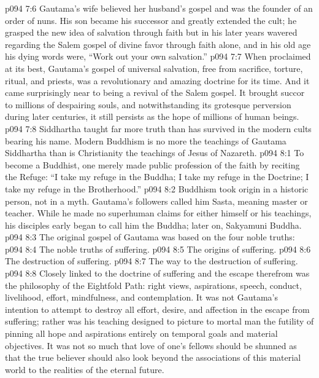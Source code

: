\vs p094 7:6 Gautama’s wife believed her husband’s gospel and was the founder of an order of nuns. His son became his successor and greatly extended the cult; he grasped the new idea of salvation through faith but in his later years wavered regarding the Salem gospel of divine favor through faith alone, and in his old age his dying words were, “Work out your own salvation.”
\pc \vs p094 7:7 When proclaimed at its best, Gautama’s gospel of universal salvation, free from sacrifice, torture, ritual, and priests, was a revolutionary and amazing doctrine for its time. And it came surprisingly near to being a revival of the Salem gospel. It brought succor to millions of despairing souls, and notwithstanding its grotesque perversion during later centuries, it still persists as the hope of millions of human beings.
\vs p094 7:8 Siddhartha taught far more truth than has survived in the modern cults bearing his name. Modern Buddhism is no more the teachings of Gautama Siddhartha than is Christianity the teachings of Jesus of Nazareth.
\vs p094 8:1 To become a Buddhist, one merely made public profession of the faith by reciting the Refuge: “I take my refuge in the Buddha; I take my refuge in the Doctrine; I take my refuge in the Brotherhood.”
\vs p094 8:2 Buddhism took origin in a historic person, not in a myth. Gautama’s followers called him Sasta, meaning master or teacher. While he made no superhuman claims for either himself or his teachings, his disciples early began to call him  the Buddha; later on, Sakyamuni Buddha.
\pc \vs p094 8:3 The original gospel of Gautama was based on the four noble truths:
\pc \vs p094 8:4 \bibnobreakspace The noble truths of suffering.
\vs p094 8:5 \bibnobreakspace The origins of suffering.
\vs p094 8:6 \bibnobreakspace The destruction of suffering.
\vs p094 8:7 \bibnobreakspace The way to the destruction of suffering.
\pc \vs p094 8:8 Closely linked to the doctrine of suffering and the escape therefrom was the philosophy of the Eightfold Path: right views, aspirations, speech, conduct, livelihood, effort, mindfulness, and contemplation. It was not Gautama’s intention to attempt to destroy all effort, desire, and affection in the escape from suffering; rather was his teaching designed to picture to mortal man the futility of pinning all hope and aspirations entirely on temporal goals and material objectives. It was not so much that love of one’s fellows should be shunned as that the true believer should also look beyond the associations of this material world to the realities of the eternal future.
